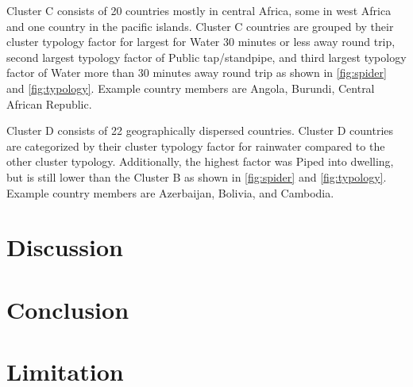 \documentclass[10pt,twoside]{article}
\numberwithin{equation}{section}
\newcommand{\?}{\stackrel{?}{=}}
\begin{document}
Cluster C consists of 20 countries mostly in central Africa, some in west Africa and one country in the pacific islands. Cluster C countries are grouped by their cluster typology factor for largest for Water 30 minutes or less away round trip, second largest typology factor of Public tap/standpipe, and third largest typology factor of Water more than 30 minutes away round trip as shown in \autoref{fig:spider} and \autoref{fig:typology}. Example country members are Angola, Burundi, Central African Republic. 

Cluster D consists of 22 geographically dispersed countries. Cluster D countries are categorized by their cluster typology factor for rainwater compared to the other cluster typology. Additionally, the highest factor was Piped into dwelling, but is still lower than the Cluster B as shown in \autoref{fig:spider} and \autoref{fig:typology}. Example country members are Azerbaijan, Bolivia, and Cambodia.  


\section{Discussion}

\section{Conclusion}

\section{Limitation}

\printbibliography
\end{document}

